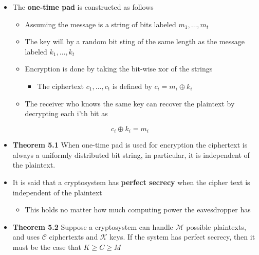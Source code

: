 \documentclass[11pt]{article}
\begin{document}
\begin{itemize}
\item The \textbf{one-time pad} is constructed as follows 
\begin{itemize}
\item Assuming the message is a string of bits labeled \(m_1, \dots,m_t\)
\item The key will by a random bit sting of the same length as the message labeled \(k_1, \dots, k_t\)
\item Encryption is done by taking the bit-wise xor of the strings
\begin{itemize}
\item The ciphertext \(c_1, \dots, c_t\) is defined by \(c_i = m_i \oplus k_i\)
\end{itemize}
\item The receiver who knows the same key can recover the plaintext by decrypting each i'th bit as
\end{itemize}
\end{itemize}
\begin{equation}
  c_i \oplus k_i  = m_i
\end{equation}

\begin{itemize}
\item \textbf{Theorem 5.1} When one-time pad is used for encryption the ciphertext is always a uniformly distributed bit string, in particular, it is independent of the plaintext.

\item It is said that a cryptosystem has \textbf{perfect secrecy} when the cipher text is independent of the plaintext 
\begin{itemize}
\item This holds no matter how much computing power the eavesdropper has
\end{itemize}

\item \textbf{Theorem 5.2} Suppose a cryptosystem can handle \(\mathcal M\) possible plaintexts, and uses \(\mathcal C\) ciphertexts and \(\mathcal K\) keys. If the system has perfect secrecy, then it must be the case that \(K \geq C \geq M\)
\end{itemize}
\end{document}
